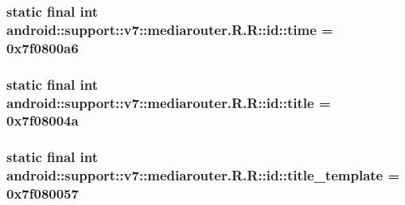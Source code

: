 \hypertarget{classandroid_1_1support_1_1v7_1_1mediarouter_1_1_r_1_1id_2f47c7a7d40ed8bd90233a984917eb4a}{
\subsubsection[{time}]{\setlength{\rightskip}{0pt plus 5cm}static final int android::support::v7::mediarouter.R.R::id::time = 0x7f0800a6}}
\label{classandroid_1_1support_1_1v7_1_1mediarouter_1_1_r_1_1id_2f47c7a7d40ed8bd90233a984917eb4a}


\hypertarget{classandroid_1_1support_1_1v7_1_1mediarouter_1_1_r_1_1id_12e8ac0a00dc4e29d6ae72c51349c5c8}{
\subsubsection[{title}]{\setlength{\rightskip}{0pt plus 5cm}static final int android::support::v7::mediarouter.R.R::id::title = 0x7f08004a}}
\label{classandroid_1_1support_1_1v7_1_1mediarouter_1_1_r_1_1id_12e8ac0a00dc4e29d6ae72c51349c5c8}


\hypertarget{classandroid_1_1support_1_1v7_1_1mediarouter_1_1_r_1_1id_326e0e2d6655d61ddaf76411aee4afce}{
\subsubsection[{title\_\-template}]{\setlength{\rightskip}{0pt plus 5cm}static final int android::support::v7::mediarouter.R.R::id::title\_\-template = 0x7f080057}}
\label{classandroid_1_1support_1_1v7_1_1mediarouter_1_1_r_1_1id_326e0e2d6655d61ddaf76411aee4afce}


